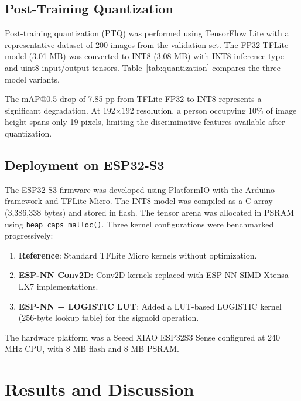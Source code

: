 \documentclass[10pt,twocolumn]{article}
\begin{document}


\subsection{Post-Training Quantization}

Post-training quantization (PTQ) was performed using TensorFlow Lite with a representative dataset of 200 images from the validation set. The FP32 TFLite model (3.01 MB) was converted to INT8 (3.08 MB) with INT8 inference type and uint8 input/output tensors. Table~\ref{tab:quantization} compares the three model variants.



The mAP@0.5 drop of 7.85 pp from TFLite FP32 to INT8 represents a significant degradation. At 192$\times$192 resolution, a person occupying 10\% of image height spans only 19 pixels, limiting the discriminative features available after quantization.

\subsection{Deployment on ESP32-S3}

The ESP32-S3 firmware was developed using PlatformIO with the Arduino framework and TFLite Micro. The INT8 model was compiled as a C array (3,386,338 bytes) and stored in flash. The tensor arena was allocated in PSRAM using \texttt{heap\_caps\_malloc()}. Three kernel configurations were benchmarked progressively:

\begin{enumerate}
  \item \textbf{Reference}: Standard TFLite Micro kernels without optimization.
  \item \textbf{ESP-NN Conv2D}: Conv2D kernels replaced with ESP-NN SIMD Xtensa LX7 implementations.
  \item \textbf{ESP-NN + LOGISTIC LUT}: Added a LUT-based LOGISTIC kernel (256-byte lookup table) for the sigmoid operation.
\end{enumerate}

The hardware platform was a Seeed XIAO ESP32S3 Sense configured at 240 MHz CPU, with 8 MB flash and 8 MB PSRAM.

\section{Results and Discussion}
\label{sec:results}
\end{document}
